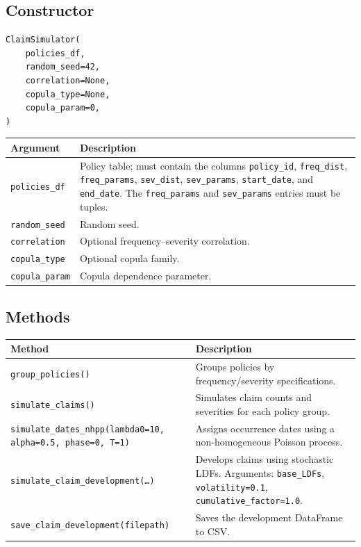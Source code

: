 \subsection*{Constructor}

\begin{lstlisting}[style=pythonstyle]
ClaimSimulator(
    policies_df,
    random_seed=42,
    correlation=None,
    copula_type=None,
    copula_param=0,
)
\end{lstlisting}

\begin{longtable}{p{}p{}}
\toprule
\textbf{Argument} & \textbf{Description} \\
\midrule
\endhead
\texttt{policies\_df}   & Policy table; must contain the columns
                         \texttt{policy\_id}, \texttt{freq\_dist},
                         \texttt{freq\_params}, \texttt{sev\_dist},
                         \texttt{sev\_params}, \texttt{start\_date},
                         and \texttt{end\_date}. The \texttt{freq\_params}
                         and \texttt{sev\_params} entries must be tuples. \\
\texttt{random\_seed}   & Random seed. \\
\texttt{correlation}    & Optional frequency--severity correlation. \\
\texttt{copula\_type}   & Optional copula family. \\
\texttt{copula\_param}  & Copula dependence parameter. \\
\bottomrule
\end{longtable}

\subsection*{Methods}

\begin{longtable}{p{}p{}}
\toprule
\textbf{Method} & \textbf{Description} \\
\midrule
\endhead
\texttt{group\_policies()} &
    Groups policies by frequency/severity specifications. \\
\texttt{simulate\_claims()} &
    Simulates claim counts and severities for each policy group. \\
\texttt{simulate\_dates\_nhpp(lambda0=10, alpha=0.5, phase=0, T=1)} &
    Assigns occurrence dates using a non-homogeneous Poisson process. \\
\texttt{simulate\_claim\_development(\dots)} &
    Develops claims using stochastic LDFs. Arguments:
    \texttt{base\_LDFs}, \texttt{volatility=0.1},
    \texttt{cumulative\_factor=1.0}. \\
\texttt{save\_claim\_development(filepath)} &
    Saves the development DataFrame to CSV. \\
\bottomrule
\end{longtable}

